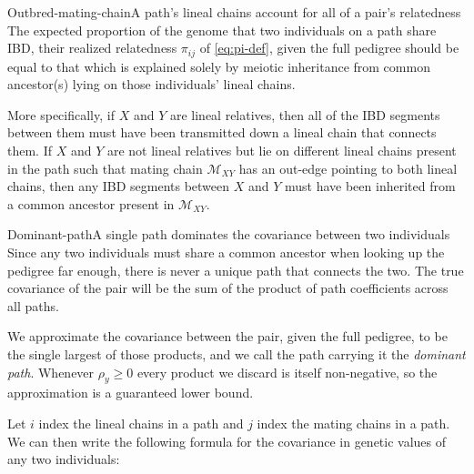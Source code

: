 \documentclass[12pt]{article}
\begin{document}
\begin{assumption}{Outbred-mating-chain}{A path's lineal chains account for all of a pair's relatedness}
    The expected proportion of the genome that two individuals on a path share IBD, their realized relatedness $\pi_{ij}$ of \eqref{eq:pi-def}, given the full pedigree should be equal to that which is explained solely by meiotic inheritance from common ancestor(s) lying on those individuals' lineal chains.

    More specifically, if $X$ and $Y$ are lineal relatives, then all of the IBD segments between them must have been transmitted down a lineal chain that connects them.
    If $X$ and $Y$ are not lineal relatives but lie on different lineal chains present in the path such that mating chain $\mathcal{M}_{XY}$ has an out-edge pointing to both lineal chains, then any IBD segments between $X$ and $Y$ must have been inherited from a common ancestor present in $\mathcal{M}_{XY}$.
\end{assumption}

\begin{approximation}{Dominant-path}{A single path dominates the covariance between two individuals}
    Since any two individuals must share a common ancestor when looking up the pedigree far enough, there is never a unique path that connects the two.
    The true covariance of the pair will be the sum of the product of path coefficients across all paths.

    We approximate the covariance between the pair, given the full pedigree, to be the single largest of those products, and we call the path carrying it the \emph{dominant path}.
    Whenever $\rho_y \geq 0$ every product we discard is itself non-negative, so the approximation is a guaranteed lower bound.
\end{approximation}

Let $i$ index the lineal chains in a path and $j$ index the mating chains in a path.
We can then write the following formula for the covariance in genetic values of any two individuals:
\end{document}
